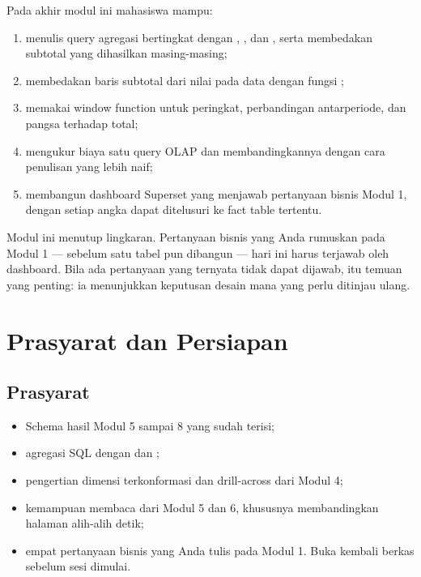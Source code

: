 \begin{capaian}
Pada akhir modul ini mahasiswa mampu:
\begin{enumerate}[leftmargin=1.4em]
  \item menulis query agregasi bertingkat dengan ,
        , dan , serta membedakan
        subtotal yang dihasilkan masing-masing;
  \item membedakan baris subtotal dari nilai  pada data dengan
        fungsi ;
  \item memakai window function untuk peringkat, perbandingan antarperiode,
        dan pangsa terhadap total;
  \item mengukur biaya satu query OLAP dan membandingkannya dengan cara
        penulisan yang lebih naif;
  \item membangun dashboard Superset yang menjawab pertanyaan bisnis Modul 1,
        dengan setiap angka dapat ditelusuri ke fact table tertentu.
\end{enumerate}
\end{capaian}

Modul ini menutup lingkaran. Pertanyaan bisnis yang Anda rumuskan pada Modul 1
--- sebelum satu tabel pun dibangun --- hari ini harus terjawab oleh dashboard.
Bila ada pertanyaan yang ternyata tidak dapat dijawab, itu temuan yang penting:
ia menunjukkan keputusan desain mana yang perlu ditinjau ulang.

\section{Prasyarat dan Persiapan}

\subsection{Prasyarat}

\begin{itemize}
  \item Schema  hasil Modul 5 sampai 8 yang sudah terisi;
  \item agregasi SQL dengan  dan ;
  \item pengertian dimensi terkonformasi dan drill-across dari Modul 4;
  \item kemampuan membaca  dari Modul 5
        dan 6, khususnya membandingkan halaman alih-alih detik;
  \item empat pertanyaan bisnis yang Anda tulis pada Modul 1. Buka kembali
        berkas  sebelum sesi dimulai.
\end{itemize}

